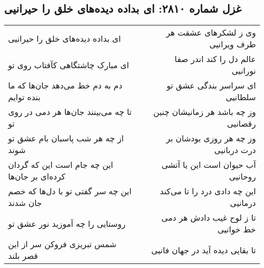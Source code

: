 \begin{center}
\section*{غزل شماره ۲۸۱۰: ای بداده دیده‌های خلق را حیرانیی}
\label{sec:2810}
\begin{longtable}{l p{0.5cm} r}
ای بداده دیده‌های خلق را حیرانیی
&&
وی ز لشکرهای عشقت هر طرف ویرانیی
\\
ای مبارک چاشتگاهی کآفتاب روی تو
&&
عالم دل را کند اندر صفا نورانیی
\\
دم به دم خط می‌دهد جان‌ها که ما بنده توایم
&&
ای سراسر بندگی عشق تو سلطانیی
\\
تا چه می‌بینند جان‌ها هر دمی در روی تو
&&
وز چه باشد هر زمانیشان چنین رقصانیی
\\
از چه هر شب پاسبان بام عشق تو شوند
&&
وز چه هر روزی بودشان بر درت دربانیی
\\
این چه جام است این که گردان کرده‌ای بر جان‌ها
&&
آب حیوان است این یا آتشی روحانیی
\\
این چه سر گفتی تو با دل‌ها که خصم جان شدند
&&
این چه دادی درد را تا می‌کند درمانیی
\\
روستایی را چه آموزید نور عشق تو
&&
تا ز لوح غیب دادش هر دمی خط خوانیی
\\
شمس تبریزی فروکن سر از این قصر بلند
&&
تا بقایی دیده آید در جهان فانیی
\\
\end{longtable}
\end{center}
